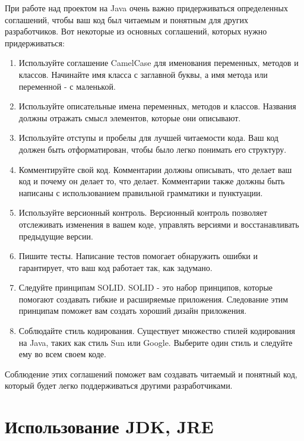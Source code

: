 При работе над проектом на Java очень важно придерживаться определенных соглашений, чтобы ваш код был читаемым и понятным для других разработчиков. Вот некоторые из основных соглашений, которых нужно придерживаться:
\begin{enumerate}
\item Используйте соглашение CamelCase для именования переменных, методов и классов. Начинайте имя класса с заглавной буквы, а имя метода или переменной - с маленькой.
\item Используйте описательные имена переменных, методов и классов. Названия должны отражать смысл элементов, которые они описывают.
\item Используйте отступы и пробелы для лучшей читаемости кода. Ваш код должен быть отформатирован, чтобы было легко понимать его структуру.
\item Комментируйте свой код. Комментарии должны описывать, что делает ваш код и почему он делает то, что делает. Комментарии также должны быть написаны с использованием правильной грамматики и пунктуации.
\item Используйте версионный контроль. Версионный контроль позволяет отслеживать изменения в вашем коде, управлять версиями и восстанавливать предыдущие версии.
\item Пишите тесты. Написание тестов помогает обнаружить ошибки и гарантирует, что ваш код работает так, как задумано.
\item Следуйте принципам SOLID. SOLID - это набор принципов, которые помогают создавать гибкие и расширяемые приложения. Следование этим принципам поможет вам создать хороший дизайн приложения.
\item Соблюдайте стиль кодирования. Существует множество стилей кодирования на Java, таких как стиль Sun или Google. Выберите один стиль и следуйте ему во всем своем коде.
\end{enumerate}

Соблюдение этих соглашений поможет вам создавать читаемый и понятный код, который будет легко поддерживаться другими разработчиками.

\section{Использование JDK, JRE}

